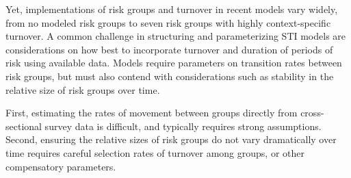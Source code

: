 \documentclass[12pt]{article}
\begin{document}
\par
Yet, implementations of risk groups and turnover in recent models vary widely,
from no modeled risk groups%
to seven risk groups with highly context-specific turnover. %
A common challenge in structuring and parameterizing
STI models are considerations on how best to incorporate 
turnover and duration of periods of risk using available
data. Models require parameters on transition rates between
risk groups, but must also contend with considerations such as
stability in the relative size of risk groups over time.

First, estimating the rates of movement between groups
directly from cross-sectional survey data is difficult,
and typically requires strong assumptions. %
Second, ensuring the relative sizes of risk groups do not vary
dramatically over time requires
careful selection rates of turnover among groups,
or other compensatory parameters. %
\end{document}
